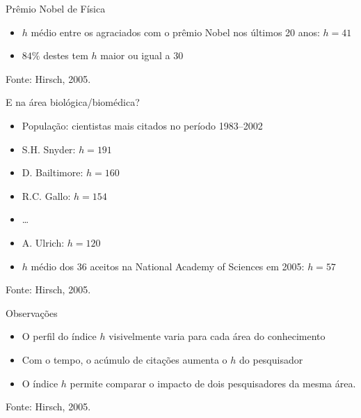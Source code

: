 \documentclass{beamer}
\begin{document}
\begin{frame}{Prêmio Nobel de Física}
  \begin{itemize}
  \item $h$ médio entre os agraciados com o prêmio Nobel nos últimos 20 anos: $h=41$
  \item $84\%$ destes tem $h$ maior ou igual a 30
  \end{itemize}

\vfill
Fonte: Hirsch, 2005.
\end{frame}

\begin{frame}{E na área biológica/biomédica?}
  \begin{itemize}
  \item População: cientistas mais citados no período 1983--2002
  \item<1-> S.H. Snyder: $h=191$
  \item<1-> D. Bailtimore: $h=160$
  \item<1-> R.C. Gallo: $h=154$
  \item<1-> \ldots
  \item<1-> A. Ulrich: $h=120$
  \item<2-> $h$ médio dos 36 aceitos na National Academy of Sciences em 2005: $h=57$
  \end{itemize}

\vfill
Fonte: Hirsch, 2005.
\end{frame}

\begin{frame}{Observações}
  \begin{itemize}
  \item O perfil do índice $h$ visivelmente varia para cada área do conhecimento
  \item Com o tempo, o acúmulo de citações aumenta o $h$ do pesquisador
  \item O índice $h$ permite comparar o impacto de dois pesquisadores da mesma área.
  \end{itemize}

\vfill
Fonte: Hirsch, 2005.
\end{frame}


\end{document}
